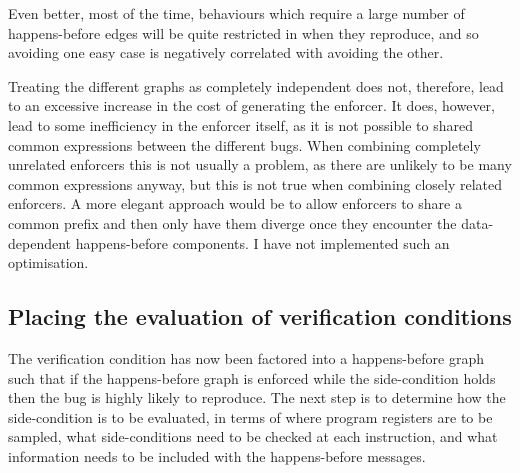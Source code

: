 Even better, most of the time, behaviours which require a large number
of happens-before edges will be quite restricted in when they
reproduce, and so avoiding one easy case is negatively correlated with
avoiding the other.


Treating the different graphs as completely independent does not,
therefore, lead to an excessive increase in the cost of generating the
enforcer.  It does, however, lead to some inefficiency in the enforcer
itself, as it is not possible to shared common expressions between the
different bugs.  When combining completely unrelated enforcers this is
not usually a problem, as there are unlikely to be many common
expressions anyway, but this is not true when combining closely
related enforcers.  A more elegant approach would be to allow
enforcers to share a common prefix and then only have them diverge
once they encounter the data-dependent happens-before components.  I
have not implemented such an optimisation.

\subsection{Placing the evaluation of verification conditions}
\label{sect:enforce:place_vcs}
The verification condition has now been factored into a happens-before
graph such that if the happens-before graph is enforced while the
side-condition holds then the bug is highly likely to reproduce.  The
next step is to determine how the side-condition is to be evaluated,
in terms of where program registers are to be sampled, what
side-conditions need to be checked at each instruction, and what
information needs to be included with the happens-before messages.


